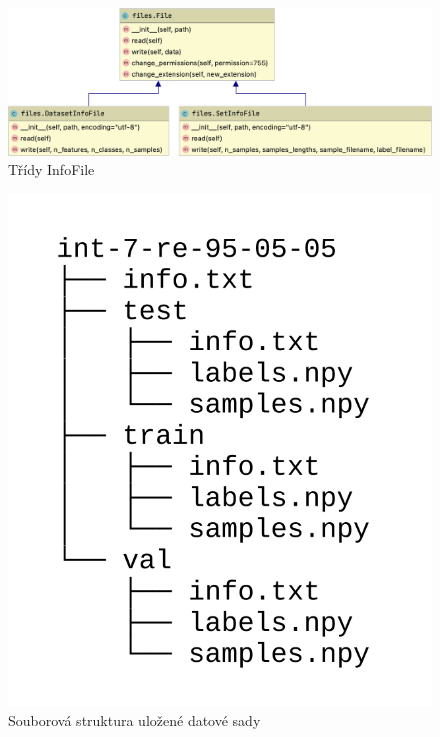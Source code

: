 \documentclass[FM,BP]{tulthesis}
\begin{document}
\begin{figure}[h]
\centerline{\includegraphics[scale=.25]{files-info.png}}
\caption{Třídy InfoFile}
\label{fig:info_files}
\end{figure}
\FloatBarrier

\begin{figure}[h]
\centerline{\includegraphics[scale=.22]{dataset_file_structure.png}}
\caption{Souborová struktura uložené datové sady}
\label{fig:file_structure}
\end{figure}
\FloatBarrier
\end{document}

